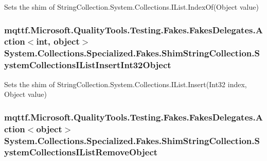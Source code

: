 Sets the shim of String\-Collection.\-System.\-Collections.\-I\-List.\-Index\-Of(\-Object value)

\hypertarget{class_system_1_1_collections_1_1_specialized_1_1_fakes_1_1_shim_string_collection_af6eb6fec65c400f08587c688fc77c20f}{
\subsubsection[{System\-Collections\-I\-List\-Insert\-Int32\-Object}]{\setlength{\rightskip}{0pt plus 5cm}mqttf.\-Microsoft.\-Quality\-Tools.\-Testing.\-Fakes.\-Fakes\-Delegates.\-Action$<$int, object$>$ System.\-Collections.\-Specialized.\-Fakes.\-Shim\-String\-Collection.\-System\-Collections\-I\-List\-Insert\-Int32\-Object\hspace{0.3cm}{\ttfamily [set]}}}\label{class_system_1_1_collections_1_1_specialized_1_1_fakes_1_1_shim_string_collection_af6eb6fec65c400f08587c688fc77c20f}


Sets the shim of String\-Collection.\-System.\-Collections.\-I\-List.\-Insert(\-Int32 index, Object value)

\hypertarget{class_system_1_1_collections_1_1_specialized_1_1_fakes_1_1_shim_string_collection_ad5b3585857151e6f8ba771ca54ff3176}{
\subsubsection[{System\-Collections\-I\-List\-Remove\-Object}]{\setlength{\rightskip}{0pt plus 5cm}mqttf.\-Microsoft.\-Quality\-Tools.\-Testing.\-Fakes.\-Fakes\-Delegates.\-Action$<$object$>$ System.\-Collections.\-Specialized.\-Fakes.\-Shim\-String\-Collection.\-System\-Collections\-I\-List\-Remove\-Object\hspace{0.3cm}{\ttfamily [set]}}}\label{class_system_1_1_collections_1_1_specialized_1_1_fakes_1_1_shim_string_collection_ad5b3585857151e6f8ba771ca54ff3176}


